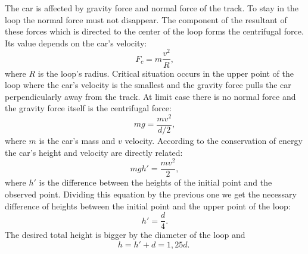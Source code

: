 \documentclass[11pt]{article}
\begin{document}
\solueng
The car is affected by gravity force and normal force of the track. To stay in the loop the normal force must not disappear. The component of the resultant of these forces which is directed to the center of the loop forms the centrifugal force. Its value depends on the car’s velocity:
\[F_c=m\frac{v^2}{R},\] 
where $R$ is the loop’s radius. Critical situation occurs in the upper point of the loop where the car’s velocity is the smallest and the gravity force pulls the car perpendicularly away from the track. At limit case there is no normal force and the gravity force itself is the centrifugal force:
\[ mg=\frac{mv^2}{d/2},\] 
where $m$ is the car’s mass and $v$ velocity. According to the conservation of energy the car’s height and velocity are directly related:
\[ mgh'=\frac{mv^2}{2},\]
where $h'$ is the difference between the heights of the initial point and the observed point. Dividing this equation by the previous one we get the necessary difference of heights between the initial point and the upper point of the loop:
\[ h'=\frac{d}{4}.\]
The desired total height is bigger by the diameter of the loop and
\[ h=h'+d=1,25d.\;\]
\probend
\bigskip

\end{document}
